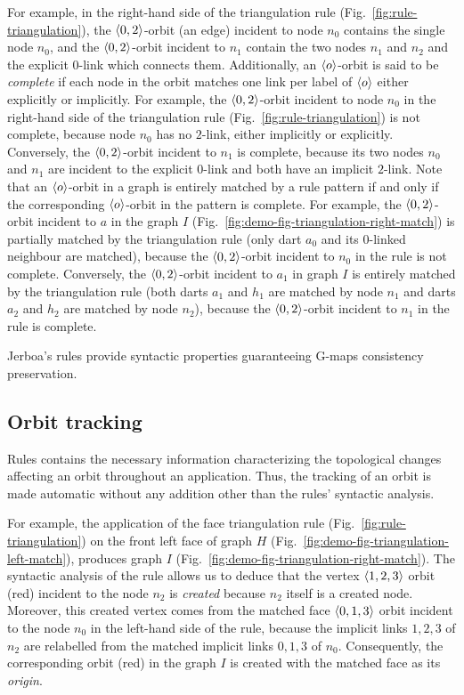 For example, in the right-hand side of the triangulation rule
(Fig.~\ref{fig:rule-triangulation}), the $\langle0, 2\rangle$-orbit (an edge) incident
to node $n_{0}$ contains the single node $n_0$, and the $\langle0, 2\rangle$-orbit
incident to $n_1$ contain the two nodes $n_1$ and $n_2$ and the explicit
$0$-link which connects them. %
Additionally, an $\langle o\rangle$-orbit is said to be \emph{complete} if each node in
the orbit matches one link per label of $\langle o\rangle$ either explicitly or
implicitly. %
For example, the $\langle0, 2\rangle$-orbit incident to node $n_{0}$ in the right-hand
side of the triangulation rule (Fig.~\ref{fig:rule-triangulation}) is not
complete, because node $n_0$ has no $2$-link, either implicitly or explicitly. %
Conversely, the $\langle0, 2\rangle$-orbit incident to $n_1$ is complete, because its
two nodes $n_0$ and $n_1$ are incident to the explicit $0$-link and both have an
implicit $2$-link. %
Note that an $\langle o\rangle$-orbit in a graph is entirely matched by a rule pattern
if and only if the corresponding $\langle o\rangle$-orbit in the pattern is complete. %
For example, the $\langle0, 2\rangle$-orbit incident to $a$ in the graph $I$
(Fig.~\ref{fig:demo-fig-triangulation-right-match}) is partially matched by the
triangulation rule (only dart $a_{0}$ and its $0$-linked neighbour are matched),
because the $\langle0, 2\rangle$-orbit incident to $n_0$ in the rule is not
complete. %
Conversely, the $\langle0, 2\rangle$-orbit incident to $a_1$ in graph $I$ is entirely
matched by the triangulation rule (both darts $a_1$ and $h_1$ are matched by
node $n_1$ and darts $a_2$ and $h_2$ are matched by node $n_2$), because the
$\langle0, 2\rangle$-orbit incident to $n_1$ in the rule is complete. %

Jerboa's rules provide syntactic properties guaranteeing G-maps consistency
preservation. %

\subsection{Orbit tracking}

Rules contains the necessary information characterizing the topological changes
affecting an orbit throughout an application. %
Thus, the tracking of an orbit is made automatic without any addition other than
the rules' syntactic analysis. %

For example, the application of the face triangulation rule
(Fig.~\ref{fig:rule-triangulation}) on the front left face of graph $H$
(Fig.~\ref{fig:demo-fig-triangulation-left-match}), produces graph $I$
(Fig.~\ref{fig:demo-fig-triangulation-right-match}). %
The syntactic analysis of the rule allows us to deduce that the vertex
$\langle1,2,3\rangle$ orbit (red) incident to the node $n_2$ is \emph{created} because
$n_2$ itself is a created node. %
Moreover, this created vertex comes from the matched face $\langle0,1,3\rangle$ orbit
incident to the node $n_0$ in the left-hand side of the rule, because the
implicit links $1,2,3$ of $n_2$ are relabelled from the matched implicit links
$0,1,3$ of $n_0$. %
Consequently, the corresponding orbit (red) in the graph $I$ is created with the
matched face as its \emph{origin}. %

